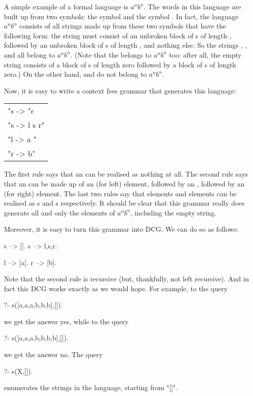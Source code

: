 A simple example of a formal language is $a^nb^n$.  The words in this
language are built up from two symbols: the symbol  and the
symbol .  In fact, the language $a^nb^n$ consists of all
strings made up from these two symbols that have the following form:
the string must consist of an unbroken block of s of length
, followed by an unbroken block of s of length
, and nothing else.  So the strings ,
,  and  all belong to
$a^nb^n$. (Note that the  belongs to $a^nb^n$
too: after all, the empty string consists of a block of s
of length zero followed by a block of s of length zero.)
On the other hand,  and  do not belong to
$a^nb^n$.

Now, it is easy to write a context free grammar that generates this
language:

\begin{center}\begin{tabular}{l}
"s -> "$\epsilon$\\
"s -> l s r"\\
"l -> a "\\
"r -> b"
\end{tabular}\end{center}

The first rule says that an  can be realised as nothing at
all.  The second rule says that an  can be made up of an
 (for left) element, followed by an , followed
by an  (for right) element. The last two rules say that
 elements and  elements can be realised as
s and s respectively. It should be clear that
this grammar really does generate all and only the elements of
$a^nb^n$, including the empty string.

Moreover, it is easy to turn this grammar into DCG. We can do so as
follows:
\begin{LPNcodedisplay}
s --> [].
s --> l,s,r.

l --> [a].
r --> [b].
\end{LPNcodedisplay}
Note that the second rule is recursive (but, thankfully, not left
recursive).  And in fact this DCG works exactly as we would hope. For
example, to the query
\begin{LPNcodedisplay}
?- s([a,a,a,b,b,b],[]).
\end{LPNcodedisplay}
we get the answer yes, while to the query
\begin{LPNcodedisplay}
?- s([a,a,a,b,b,b,b],[]).
\end{LPNcodedisplay}
we get the answer no. The query
\begin{LPNcodedisplay}
?- s(X,[]).
\end{LPNcodedisplay}
enumerates  the strings in the language, starting
from "[]".


